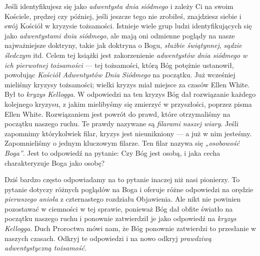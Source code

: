 Jeśli identyfikujesz się jako \textit{adwentysta dnia siódmego} i zależy Ci na swoim Kościele, prędzej czy później, jeśli jeszcze tego nie zrobiłeś, znajdziesz siebie i swój Kościół w kryzysie tożsamości. Istnieje wiele grup ludzi identyfikujących się jako \textit{adwentystami dnia siódmego}, ale mają oni odmienne poglądy na nasze najważniejsze doktryny, takie jak doktryna o Bogu, \textit{służbie świątynnej}, \textit{sądzie śledczym} itd. Celem tej książki jest zakorzenienie \textit{adwentystów dnia siódmego w ich pierwotnej tożsamości} — tej tożsamości, którą Bóg potężnie ustanowił, powołując \textit{Kościół Adwentystów Dnia Siódmego} na początku. Już wcześniej mieliśmy kryzysy tożsamości; wielki kryzys miał miejsce za czasów Ellen White. Był to \textit{kryzys Kellogga}. W odpowiedzi na ten kryzys Bóg dał rozwiązanie każdego kolejnego kryzysu, z jakim mielibyśmy się zmierzyć w przyszłości, poprzez pisma Ellen White. Rozwiązaniem jest powrót do prawd, które otrzymaliśmy na początku naszego ruchu. Te prawdy nazywane są \textit{filarami naszej wiary}. Jeśli zapomnimy którykolwiek filar, kryzys jest nieunikniony — a już w nim jesteśmy. Zapomnieliśmy o jednym kluczowym filarze. Ten filar nazywa się \textit{„osobowość Boga”}. Jest to odpowiedź na pytanie: Czy Bóg jest osobą, i jaka cecha charakteryzuje Boga jako osobę?

Dziś bardzo często odpowiadamy na to pytanie inaczej niż nasi pionierzy. To pytanie dotyczy różnych poglądów na Boga i oferuje różne odpowiedzi na orędzie \textit{pierwszego anioła} z czternastego rozdziału Objawienia. Ale nikt nie powinien pozostawać w ciemności w tej sprawie, ponieważ Bóg dał obfite światło na początku naszego ruchu i ponownie zatwierdził je jako odpowiedź na \textit{kryzys Kellogga}. Duch Proroctwa mówi nam, że Bóg ponownie zatwierdzi to przesłanie w naszych czasach. Odkryj te odpowiedzi i na nowo odkryj \textit{prawdziwą adwentystyczną tożsamość}.